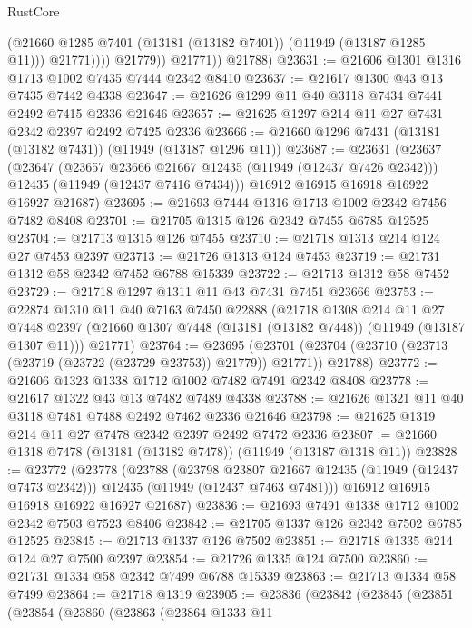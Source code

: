 \begin{lexlean}{RustCore}
\begin{coremodule}
                      (@21660 @1285 @7401 (@13181 (@13182 @7401)) (@11949 (@13187 @1285 @11)))
                      @21771))))
              @21779))
          @21771))
      @21788)
@23631 := @21606 @1301 @1316 @1713 @1002 @7435 @7444 @2342 @8410
@23637 := @21617 @1300 @43 @13 @7435 @7442 @4338
@23647 := @21626 @1299 @11 @40 @3118 @7434 @7441 @2492 @7415 @2336 @21646
@23657 := @21625 @1297 @214 @11 @27 @7431 @2342 @2397 @2492 @7425 @2336
@23666 := @21660 @1296 @7431 (@13181 (@13182 @7431)) (@11949 (@13187 @1296 @11))
@23687 := @23631
    (@23637
      (@23647
        (@23657 @23666 @21667 @12435 (@11949 (@12437 @7426 @2342)))
        @12435
        (@11949 (@12437 @7416 @7434)))
      @16912
      @16915
      @16918
      @16922
      @16927
      @21687)
@23695 := @21693 @7444 @1316 @1713 @1002 @2342 @7456 @7482 @8408
@23701 := @21705 @1315 @126 @2342 @7455 @6785 @12525
@23704 := @21713 @1315 @126 @7455
@23710 := @21718 @1313 @214 @124 @27 @7453 @2397
@23713 := @21726 @1313 @124 @7453
@23719 := @21731 @1312 @58 @2342 @7452 @6788 @15339
@23722 := @21713 @1312 @58 @7452
@23729 := @21718 @1297 @1311 @11 @43 @7431 @7451 @23666
@23753 := @22874
    @1310
    @11
    @40
    @7163
    @7450
    @22888
    (@21718
      @1308
      @214
      @11
      @27
      @7448
      @2397
      (@21660 @1307 @7448 (@13181 (@13182 @7448)) (@11949 (@13187 @1307 @11)))
      @21771)
@23764 := @23695
    (@23701 (@23704 (@23710 (@23713 (@23719 (@23722 (@23729 @23753)) @21779)) @21771)) @21788)
@23772 := @21606 @1323 @1338 @1712 @1002 @7482 @7491 @2342 @8408
@23778 := @21617 @1322 @43 @13 @7482 @7489 @4338
@23788 := @21626 @1321 @11 @40 @3118 @7481 @7488 @2492 @7462 @2336 @21646
@23798 := @21625 @1319 @214 @11 @27 @7478 @2342 @2397 @2492 @7472 @2336
@23807 := @21660 @1318 @7478 (@13181 (@13182 @7478)) (@11949 (@13187 @1318 @11))
@23828 := @23772
    (@23778
      (@23788
        (@23798 @23807 @21667 @12435 (@11949 (@12437 @7473 @2342)))
        @12435
        (@11949 (@12437 @7463 @7481)))
      @16912
      @16915
      @16918
      @16922
      @16927
      @21687)
@23836 := @21693 @7491 @1338 @1712 @1002 @2342 @7503 @7523 @8406
@23842 := @21705 @1337 @126 @2342 @7502 @6785 @12525
@23845 := @21713 @1337 @126 @7502
@23851 := @21718 @1335 @214 @124 @27 @7500 @2397
@23854 := @21726 @1335 @124 @7500
@23860 := @21731 @1334 @58 @2342 @7499 @6788 @15339
@23863 := @21713 @1334 @58 @7499
@23864 := @21718 @1319
@23905 := @23836
    (@23842
      (@23845
        (@23851
          (@23854
            (@23860
              (@23863
                (@23864
                  @1333
                  @11

\end{coremodule}
\end{lexlean}
